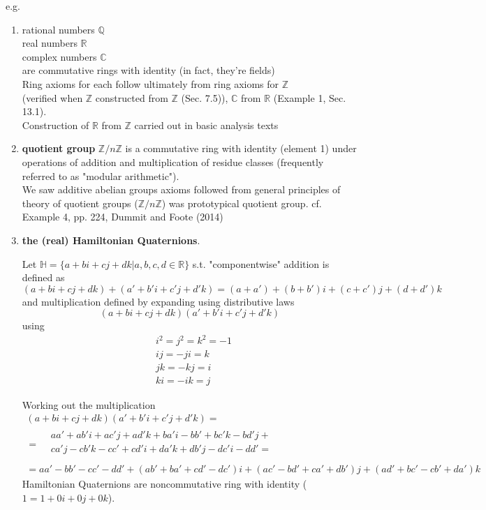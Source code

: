 e.g. 
\begin{enumerate}
	\item rational numbers $\mathbb{Q}$ \\
	real numbers $\mathbb{R}$ \\
	complex numbers $\mathbb{C}$ \\ 
	are commutative rings with identity (in fact, they're fields) \\
	Ring axioms for each follow ultimately from ring axioms for $\mathbb{Z}$ \\
	(verified when $\mathbb{Z}$ constructed from $\mathbb{Z}$ (Sec. 7.5)), $\mathbb{C}$ from $\mathbb{R}$ (Example 1, Sec. 13.1). \\
	Construction of $\mathbb{R}$ from $\mathbb{Z}$ carried out in basic analysis texts
	\item \textbf{quotient group} $\mathbb{Z}/n\mathbb{Z}$ is a commutative ring with identity (element 1) under operations of addition and multiplication of residue classes (frequently referred to as "modular arithmetic").  \\
	We saw additive abelian groups axioms followed from general principles of theory of quotient groups ($\mathbb{Z}/n\mathbb{Z}$) was prototypical quotient group. cf. Example 4, pp. 224, Dummit and Foote (2014)\cite{agat:DuFo2003}
	\item \textbf{the (real) Hamiltonian Quaternions}.  
	\begin{definition}
		Let $\mathbb{H} = \lbrace a+ bi + cj + dk | a,b,c,d \in \mathbb{R} \rbrace$ s.t. 
		"componentwise" addition is defined as 
		\begin{equation}
		(a+bi + cj+dk) + (a' + b'i + c'j + d'k) = (a+a') + (b+b')i + (c+c')j + (d+d')k
		\end{equation} and multiplication defined by expanding using distributive laws 
		\[
		(a+bi + cj +dk)(a' + b'i + c'j +d' k)
		\]
		using 
		\begin{equation}
		\begin{aligned}
		& i^2 = j^2 =k^2 = -1 \\
		& ij = -ji = k \\
		& jk = -kj = i \\
		& ki = -ik = j
		\end{aligned}
		\end{equation}
	\end{definition}
Working out the multiplication
\[
\begin{gathered}
(a+bi + cj + dk)(a'+b'i + c'j + d'k) =  \\
= \begin{aligned}
& aa' + ab' i + ac'j + ad'k + ba' i - bb' + bc' k -bd' j + \\
& ca'j - cb' k - cc' + cd' i + da' k + db' j - dc' i -dd' = \\
\end{aligned} \\
= aa' - bb' -cc' -dd' + (ab' + ba' + cd' -dc')i + (ac' - bd' + ca' +db')j + (ad' + bc' - cb' + da')k 
\end{gathered}
\]
Hamiltonian Quaternions are noncommutative ring with identity ($1= 1 + 0i + 0j + 0k$). 


\end{enumerate}
